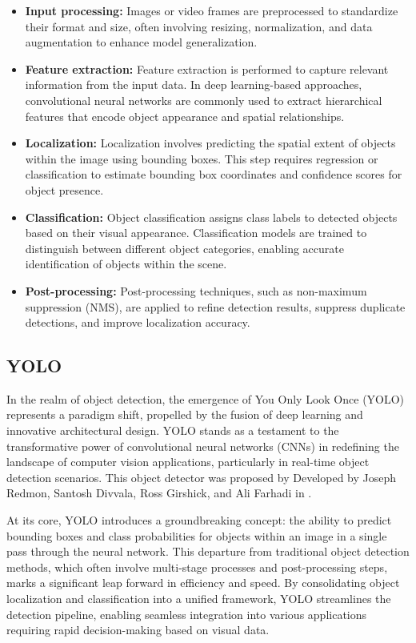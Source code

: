 \begin{itemize}
  \item \textbf{Input processing:} Images or video frames are preprocessed to standardize their format and size, often
involving resizing, normalization, and data augmentation to enhance model generalization.
  \item \textbf{Feature extraction:} Feature extraction is performed to capture relevant information from the input
  data. In deep learning-based approaches, convolutional neural networks are commonly used to extract hierarchical features that encode object appearance and spatial relationships.
  \item \textbf{Localization:} Localization involves predicting the spatial extent of objects within the image using
bounding boxes. This step requires regression or classification to estimate bounding box coordinates and confidence scores for object presence.
  \item \textbf{Classification:} Object classification assigns class labels to detected objects based on their visual
  appearance. Classification models are trained to distinguish between different object categories, enabling accurate identification of objects within the scene.
  \item \textbf{Post-processing:} Post-processing techniques, such as non-maximum suppression (NMS), are applied to
  refine detection results, suppress duplicate detections, and improve localization accuracy.
\end{itemize}



  \subsection{YOLO}

In the realm of object detection, the emergence of You Only Look Once (YOLO) represents a paradigm shift, propelled by the fusion of deep learning and innovative architectural design. YOLO stands as a testament to the transformative power of convolutional neural networks (CNNs) in redefining the landscape of computer vision applications, particularly in real-time object detection scenarios. This object detector was proposed by Developed by Joseph Redmon, Santosh Divvala, Ross Girshick, and Ali Farhadi in \cite{YOLORedmon2016}.

At its core, YOLO introduces a groundbreaking concept: the ability to predict bounding boxes and class probabilities for objects within an image in a single pass through the neural network. This departure from traditional object detection methods, which often involve multi-stage processes and post-processing steps, marks a significant leap forward in efficiency and speed. By consolidating object localization and classification into a unified framework, YOLO streamlines the detection pipeline, enabling seamless integration into various applications requiring rapid decision-making based on visual data.


